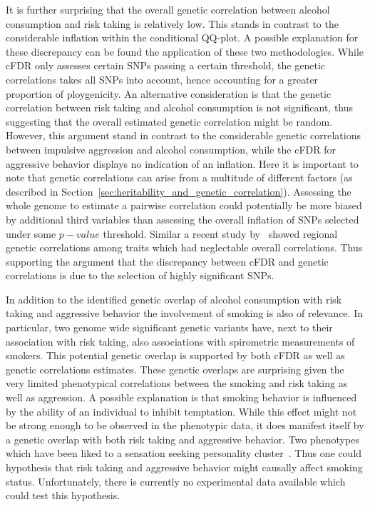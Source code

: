 It is further surprising that the overall genetic correlation between alcohol consumption and risk taking is relatively low.
This stands in contrast to the considerable inflation within the conditional QQ-plot.
A possible explanation for these discrepancy can be found the application of these two methodologies.
While cFDR only assesses certain SNPs passing a certain threshold, the genetic correlations takes all SNPs into account, hence accounting for a greater proportion of ploygenicity.
An alternative consideration is that the genetic correlation between risk taking and alcohol consumption is not significant, thus suggesting that the overall estimated genetic correlation might be random.
However, this argument stand in contrast to the considerable genetic correlations between impulsive aggression and alcohol consumption, while the cFDR for aggressive behavior displays no indication of an inflation.
Here it is important to note that genetic correlations can arise from a multitude of different factors (as described in Section~\ref{sec:heritability_and_genetic_correlation}).
Assessing the whole genome to estimate a pairwise correlation could potentially be more biased by additional third variables than assessing the overall inflation of SNPs selected under some $p-value$ threshold.
Similar a recent study by~\citet{Shi2016a} showed regional genetic correlations among traits which had neglectable overall correlations.
Thus supporting the argument that the discrepancy between cFDR and genetic correlations is due to the selection of highly significant SNPs.

In addition to the identified genetic overlap of alcohol consumption with risk taking and aggressive behavior the involvement of smoking is also of relevance.
In particular, two genome wide significant genetic variants have, next to their association with risk taking, also associations with spirometric measurements of smokers.
This potential genetic overlap is supported by both cFDR as well as genetic correlations estimates.
These genetic overlaps are surprising given the very limited phenotypical correlations between the smoking and risk taking as well as aggression.
A possible explanation is that smoking behavior is influenced by the ability of an individual to  inhibit temptation.
While this effect might not be strong enough to be observed in the phenotypic data, it does manifest itself by a genetic overlap with both risk taking and aggressive behavior.
Two phenotypes which have been liked to a sensation seeking personality cluster~\cite{Zuckerman2000}.
Thus one could hypothesis that risk taking and aggressive behavior might causally affect smoking status.
Unfortunately, there is currently no experimental data available which could test this hypothesis.

